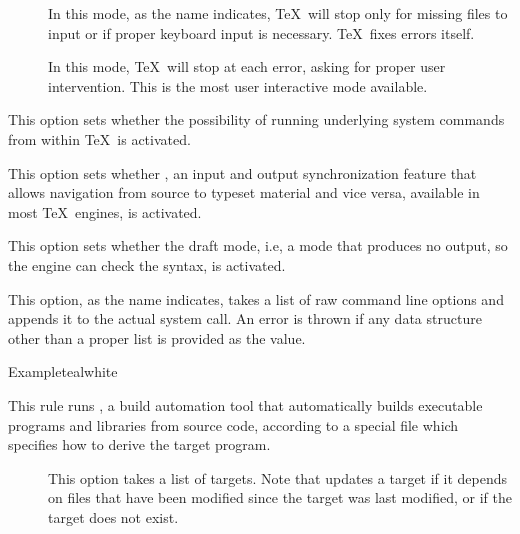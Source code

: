 \begin{description}
\begin{description}
\begin{description}
\item[] In this mode, as the name indicates, \TeX\ will stop only for missing files to input or if proper keyboard input is necessary. \TeX\ fixes errors itself.

\item[] In this mode, \TeX\ will stop at each error, asking for proper user intervention. This is the most user interactive mode available.
\end{description}

\item[\rpsbox{shell}] This option sets whether the possibility of running underlying system commands from within \TeX\ is activated.

\item[\rpsbox{synctex}] This option sets whether , an input and output synchronization feature that allows navigation from source to typeset material and vice versa, available in most \TeX\ engines, is activated.

\item[\rpsbox{draft}] This option sets whether the draft mode, i.e, a mode that produces no output, so the engine can check the syntax, is activated.

\item[\abox{options}] This option, as the name indicates, takes a list of raw command line options and appends it to the actual system call. An error is thrown if any data structure other than a proper list is provided as the value.
\end{description}

\begin{codebox}{Example}{teal}{\icnote}{white}
\end{codebox}

\item[\rulebox{make}{Marco Daniel, Paulo Cereda}] This rule runs , a build automation tool that automatically builds executable programs and libraries from source code, according to a special file which specifies how to derive the target program.

\begin{description}
\item[] This option takes a list of targets. Note that  updates a target if it depends on files that have been modified since the target was last modified, or if the target does not exist.


\end{description}
\end{description}
